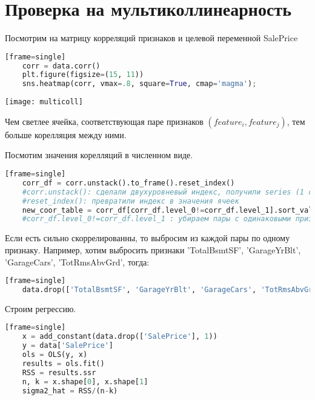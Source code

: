 \section{Проверка на мультиколлинеарность}\label{cha:linreg2/sec:multi}

	Посмотрим на матрицу корреляций признаков и целевой переменной SalePrice
	
\begin{lstlisting}[language=Python][frame=single]
	corr = data.corr()
	plt.figure(figsize=(15, 11))
	sns.heatmap(corr, vmax=.8, square=True, cmap='magma');
\end{lstlisting}
\begin{center}
	\texttt{[image: multicoll]} 
\end{center}

	Чем светлее ячейка, соответствующая паре признаков $ (feature_i, feature_j) $, тем больше корелляция между ними.
	
	Посмотим значения корелляций в численном виде.
	
\begin{lstlisting}[language=Python][frame=single]
	corr_df = corr.unstack().to_frame().reset_index() 
	#corr.unstack(): сделали двухуровневый индекс, получили series (1 столбец со сложным индексом)
	#reset_index(): превратили индекс в значения ячеек
	new_coor_table = corr_df[corr_df.level_0!=corr_df.level_1].sort_values(0, ascending=False)
	#corr_df.level_0!=corr_df.level_1 : убираем пары с одинаковыми признаками
\end{lstlisting}

	Если есть сильно скоррелированны, то выбросим из каждой пары по одному признаку. Например, хотим выбросить признаки 'TotalBsmtSF', 'GarageYrBlt', 'GarageCars', 'TotRmsAbvGrd', тогда:

\begin{lstlisting}[language=Python][frame=single]
	data.drop(['TotalBsmtSF', 'GarageYrBlt', 'GarageCars', 'TotRmsAbvGrd'], 1, inplace=True)
\end{lstlisting}

	Строим регрессию.
	
\begin{lstlisting}[language=Python][frame=single]
	x = add_constant(data.drop(['SalePrice'], 1))
	y = data['SalePrice']
	ols = OLS(y, x)
	results = ols.fit()
	RSS = results.ssr
	n, k = x.shape[0], x.shape[1]
	sigma2_hat = RSS/(n-k)
\end{lstlisting}

